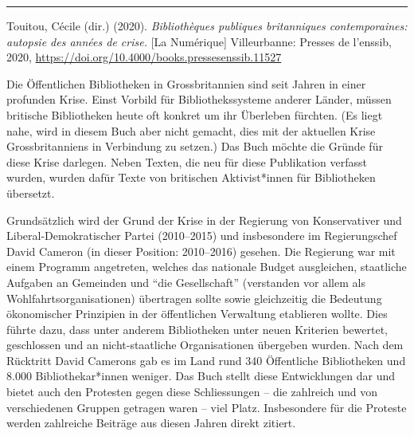 \documentclass[a4paper,
fontsize=11pt,
oneside,
numbers=noperiodatend,
parskip=half-,
bibliography=totoc,
final
]{scrartcl}
\begin{document}
\begin{center}\rule{0.5\linewidth}{0.5pt}\end{center}

Touitou, Cécile (dir.) (2020). \emph{Bibliothèques publiques
britanniques contemporaines: autopsie des années de crise.} {[}La
Numérique{]} Villeurbanne: Presses de l'enssib, 2020,
\url{https://doi.org/10.4000/books.pressesenssib.11527}

Die Öffentlichen Bibliotheken in Grossbritannien sind seit Jahren in
einer profunden Krise. Einst Vorbild für Bibliothekssysteme anderer
Länder, müssen britische Bibliotheken heute oft konkret um ihr Überleben
fürchten. (Es liegt nahe, wird in diesem Buch aber nicht gemacht, dies
mit der aktuellen Krise Grossbritanniens in Verbindung zu setzen.) Das
Buch möchte die Gründe für diese Krise darlegen. Neben Texten, die neu
für diese Publikation verfasst wurden, wurden dafür Texte von britischen
Aktivist*innen für Bibliotheken übersetzt.

Grundsätzlich wird der Grund der Krise in der Regierung von
Konservativer und Liberal-Demo\-kratischer Partei (2010--2015) und
insbesondere im Regierungschef David Cameron (in dieser Position:
2010--2016) gesehen. Die Regierung war mit einem Programm angetreten,
welches das nationale Budget ausgleichen, staatliche Aufgaben an
Gemeinden und \enquote{die Gesellschaft} (verstanden vor allem als
Wohlfahrtsorganisationen) übertragen sollte sowie gleichzeitig die
Bedeutung ökonomischer Prinzipien in der öffentlichen Verwaltung
etablieren wollte. Dies führte dazu, dass unter anderem Bibliotheken
unter neuen Kriterien bewertet, geschlossen und an nicht-staatliche
Organisationen übergeben wurden. Nach dem Rücktritt David Camerons gab
es im Land rund 340 Öffentliche Bibliotheken und 8.000
Bibliothekar*innen weniger. Das Buch stellt diese Entwicklungen dar und
bietet auch den Protesten gegen diese Schliessungen -- die zahlreich und
von verschiedenen Gruppen getragen waren -- viel Platz. Insbesondere für
die Proteste werden zahlreiche Beiträge aus diesen Jahren direkt
zitiert.
\end{document}
